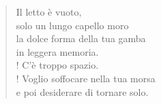 \begin{verse}
Il letto è vuoto,\\
solo un lungo capello moro\\
la dolce forma della tua gamba\\
in leggera memoria.\\!
C'è troppo spazio.\\!
Voglio soffocare nella tua morsa\\
e poi desiderare di tornare solo.
\end{verse}

